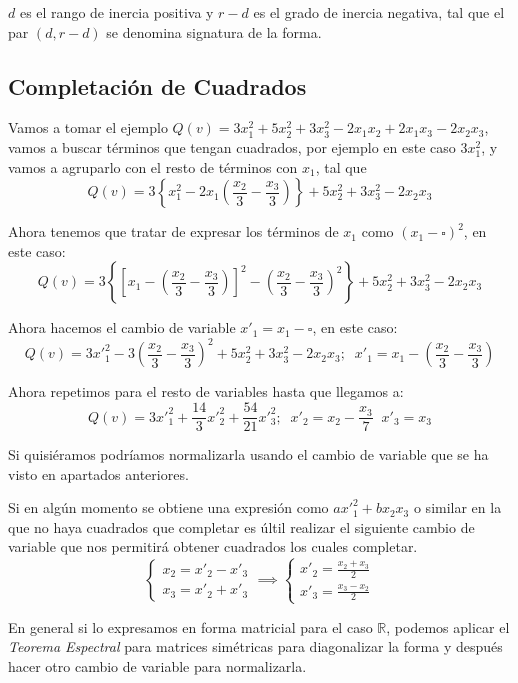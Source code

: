 \documentclass{preset}
\begin{document}
$d$ es el rango de inercia positiva y $r-d$ es el grado de inercia negativa, tal que el par $(d,r-d)$ se denomina signatura de la forma.

\vspace{-15pt}
\subsection{Completación de Cuadrados}

Vamos a tomar el ejemplo $Q(v) = 3 x_1^2+5 x_2^2+3 x_3^2 -2 x_1 x_2 + 2 x_1 x_3 - 2 x_2 x_3$, vamos a buscar términos que tengan cuadrados, por ejemplo en este caso $3 x_1^2$, y vamos a agruparlo con el resto de términos con $x_1$, tal que
\vspace{-5pt}
\[Q(v)=3\left\{x_1^2 -2 x_1 \left(\frac{x_2}{3}-\frac{x_3}{3}\right)\right\} +5 x_2^2+3 x_3^2 - 2 x_2 x_3\]

Ahora tenemos que tratar de expresar los términos de $x_1$ como $(x_1-\square)^2$, en este caso:
\vspace{-5pt}
\[Q(v)=3\left\{\left[x_1-\left(\frac{x_2}{3}-\frac{x_3}{3}\right)\right]^2-\left(\frac{x_2}{3}-\frac{x_3}{3}\right)^2\right\} +5 x_2^2+3 x_3^2 - 2 x_2 x_3\]

Ahora hacemos el cambio de variable $x'_1=x_1-\square$, en este caso:
\vspace{-5pt}
\[Q(v)=3 {x'}_1^2 -3 \left(\frac{x_2}{3}-\frac{x_3}{3}\right)^2 +5 x_2^2+3 x_3^2 - 2 x_2 x_3; \;\; x'_1=x_1-\left(\frac{x_2}{3}-\frac{x_3}{3}\right)\]

Ahora repetimos para el resto de variables hasta que llegamos a:
\vspace{-5pt}
\[Q(v)=3 {x'}_1^2 +\frac{14}{3} {x'}_2^2+\frac{54}{21} {x'}_3^2; \;\; x'_2 = x_2 -\frac{x_3}{7} \;\; x'_3=x_3\]

Si quisiéramos podríamos normalizarla usando el cambio de variable que se ha visto en apartados anteriores.

Si en algún momento se obtiene una expresión como $a {x'}_1^2+b x_2 x_3$ o similar en la que no haya cuadrados que completar es últil realizar el siguiente cambio de variable que nos permitirá obtener cuadrados los cuales completar.
\vspace{-5pt}
\[\left\{\begin{matrix}
x_2 = x'_2-x'_3 \\
x_3 = x'_2+x'_3
\end{matrix}\right. \implies \left\{\begin{matrix}
x'_2 = \frac{x_2+x_3}{2} \\
x'_3 = \frac{x_3-x_2}{2}
\end{matrix}\right. \]

En general si lo expresamos en forma matricial para el caso $\mathbb{R}$, podemos aplicar el \textit{Teorema Espectral} para matrices simétricas para diagonalizar la forma y después hacer otro cambio de variable para normalizarla.
\end{document}
